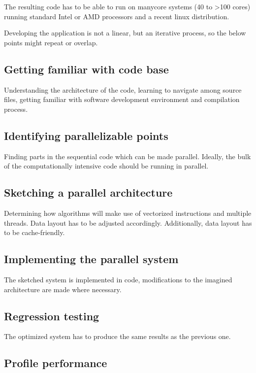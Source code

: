 \documentclass[12pt]{article}
\begin{document}
        \color{blue}
        The resulting code has to be able to run on manycore systems (40 to >100 cores) running standard Intel or AMD processors and a recent linux distribution.
        \color{black}
        
	Developing the application is not a linear, but an iterative process, so the below points might repeat or overlap.
	
	
	\subsection{Getting familiar with code base}
	
	Understanding the architecture of the code, learning to navigate among source files, getting familiar with software development environment and compilation process.
	
	\subsection{Identifying parallelizable points}
	
	Finding parts in the sequential code which can be made parallel. Ideally, the bulk of the computationally intensive code should be running in parallel.
		
	\subsection{Sketching a parallel architecture}
	
	Determining how algorithms will make use of vectorized instructions and multiple threads. Data layout has to be adjusted accordingly. Additionally, data layout has to be cache-friendly.
	
	\subsection{Implementing the parallel system}
	
	The sketched system is implemented in code, modifications to the imagined architecture are made where necessary.
	
	\subsection{Regression testing}
	
	The optimized system has to produce the same results as the previous one.
	
	\subsection{Profile performance}
	
\end{document}
